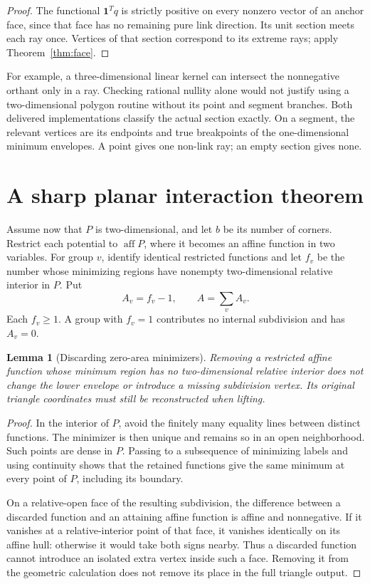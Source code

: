 \documentclass[11pt,letterpaper]{article}
\newtheorem{lemma}[theorem]{Lemma}
\theoremstyle{definition}
\theoremstyle{remark}\newtheorem{remark}[theorem]{Remark}
\newcommand{\aff}{\operatorname{aff}}
\begin{document}
\begin{proof}
The functional $\mathbf1^Tq$ is strictly positive on every nonzero vector
of an anchor face, since that face has no remaining pure link direction.
Its unit section meets each ray once. Vertices of that section correspond
to its extreme rays; apply Theorem~\ref{thm:face}.
\end{proof}

For example, a three-dimensional linear kernel can intersect the nonnegative
orthant only in a ray. Checking rational nullity alone would not justify
using a two-dimensional polygon routine without its point and segment
branches. Both delivered implementations classify the actual section
exactly. On a segment, the relevant vertices are its endpoints and true
breakpoints of the one-dimensional minimum envelopes. A point gives one
non-link ray; an empty section gives none.

\section{A sharp planar interaction theorem}
\label{sec:count}

Assume now that $P$ is two-dimensional, and let $b$ be its number of
corners. Restrict each potential to $\aff P$, where it becomes an affine
function in two variables. For group $v$, identify identical restricted
functions and let $f_v$ be the number whose minimizing regions have
nonempty two-dimensional relative interior in $P$. Put
\begin{equation}
 A_v=f_v-1,\qquad A=\sum_v A_v.
 \label{eq:activity}
\end{equation}
Each $f_v\ge1$. A group with $f_v=1$ contributes no internal subdivision
and has $A_v=0$.

\begin{lemma}[Discarding zero-area minimizers]
\label{lem:discard}
Removing a restricted affine function whose minimum region has no
two-dimensional relative interior does not change the lower envelope or
introduce a missing subdivision vertex. Its original triangle coordinates
must still be reconstructed when lifting.
\end{lemma}

\begin{proof}
In the interior of $P$, avoid the finitely many equality lines between
distinct functions. The minimizer is then unique and remains so in an open
neighborhood. Such points are dense in $P$. Passing to a subsequence of
minimizing labels and using continuity shows that the retained functions
give the same minimum at every point of $P$, including its boundary.

On a relative-open face of the resulting subdivision, the difference
between a discarded function and an attaining affine function is affine
and nonnegative. If it vanishes at a relative-interior point of that face,
it vanishes identically on its affine hull: otherwise it would take both
signs nearby. Thus a discarded function cannot introduce an isolated extra
vertex inside such a face. Removing it from the geometric calculation does
not remove its place in the full triangle output.
\end{proof}
\end{document}
